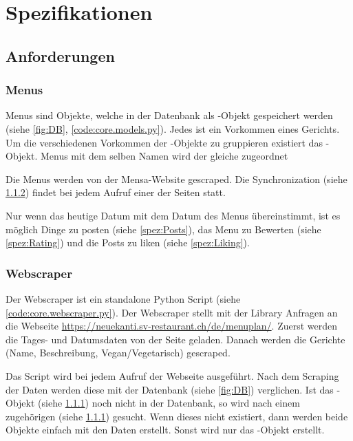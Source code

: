 \chapter{Spezifikationen}

\section{Anforderungen} \label{sec:Anforderungen}
\subsection{Menus} \label{spez:Menus}

Menus sind Objekte, welche in der Datenbank als -Objekt gespeichert
werden (siehe \ref{fig:DB}, \ref{code:core.models.py}). Jedes  ist
ein Vorkommen eines Gerichts. Um die verschiedenen Vorkommen der
-Objekte zu gruppieren existiert das -Objekt.
Menus mit dem selben Namen wird der gleiche  zugeordnet

Die Menus werden von der Mensa-Website gescraped. Die Synchronization (siehe
\ref{spez:Webscraper}) findet bei jedem Aufruf einer der Seiten statt.

Nur wenn das heutige Datum mit dem Datum des Menus übereinstimmt, ist es möglich
Dinge zu posten (siehe \ref{spez:Posts}), das Menu zu Bewerten (siehe
\ref{spez:Rating}) und die Posts zu liken (siehe \ref{spez:Liking}).

\subsection{Webscraper} \label{spez:Webscraper}

Der Webscraper ist ein standalone Python Script (siehe
\ref{code:core.webscraper.py}). Der Webscraper stellt mit der Library
 Anfragen an die Webseite
\url{https://neuekanti.sv-restaurant.ch/de/menuplan/}. Zuerst werden die Tages-
und Datumsdaten von der Seite geladen. Danach werden die Gerichte (Name,
Beschreibung, Vegan/Vegetarisch) gescraped.

Das Script wird bei jedem Aufruf der Webseite ausgeführt. Nach dem Scraping
der Daten werden diese mit der Datenbank (siehe \ref{fig:DB}) verglichen.
Ist das -Objekt (siehe \ref{spez:Menus}) noch nicht in der Datenbank,
so wird nach einem zugehörigen  (siehe \ref{spez:Menus})
gesucht. Wenn dieses nicht existiert, dann werden beide Objekte einfach mit den
Daten erstellt. Sonst wird nur das -Objekt erstellt.

